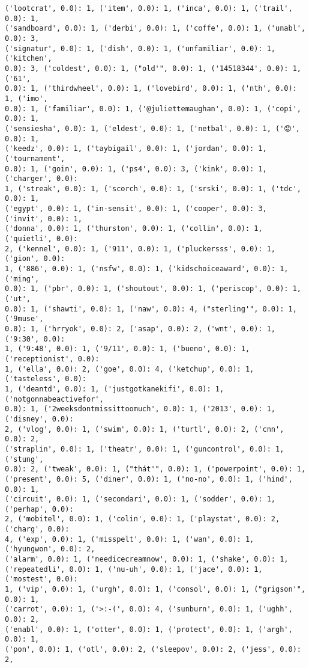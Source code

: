 \documentclass[11pt]{article}
\begin{document}
\begin{Verbatim}[commandchars=\\\{\}]
('lootcrat', 0.0): 1, ('item', 0.0): 1, ('inca', 0.0): 1, ('trail', 0.0): 1,
('sandboard', 0.0): 1, ('derbi', 0.0): 1, ('coffe', 0.0): 1, ('unabl', 0.0): 3,
('signatur', 0.0): 1, ('dish', 0.0): 1, ('unfamiliar', 0.0): 1, ('kitchen',
0.0): 3, ('coldest', 0.0): 1, ("old'", 0.0): 1, ('14518344', 0.0): 1, ('61',
0.0): 1, ('thirdwheel', 0.0): 1, ('lovebird', 0.0): 1, ('nth', 0.0): 1, ('imo',
0.0): 1, ('familiar', 0.0): 1, ('@juliettemaughan', 0.0): 1, ('copi', 0.0): 1,
('sensiesha', 0.0): 1, ('eldest', 0.0): 1, ('netbal', 0.0): 1, ('😟', 0.0): 1,
('keedz', 0.0): 1, ('taybigail', 0.0): 1, ('jordan', 0.0): 1, ('tournament',
0.0): 1, ('goin', 0.0): 1, ('ps4', 0.0): 3, ('kink', 0.0): 1, ('charger', 0.0):
1, ('streak', 0.0): 1, ('scorch', 0.0): 1, ('srski', 0.0): 1, ('tdc', 0.0): 1,
('egypt', 0.0): 1, ('in-sensit', 0.0): 1, ('cooper', 0.0): 3, ('invit', 0.0): 1,
('donna', 0.0): 1, ('thurston', 0.0): 1, ('collin', 0.0): 1, ('quietli', 0.0):
2, ('kennel', 0.0): 1, ('911', 0.0): 1, ('pluckersss', 0.0): 1, ('gion', 0.0):
1, ('886', 0.0): 1, ('nsfw', 0.0): 1, ('kidschoiceaward', 0.0): 1, ('ming',
0.0): 1, ('pbr', 0.0): 1, ('shoutout', 0.0): 1, ('periscop', 0.0): 1, ('ut',
0.0): 1, ('shawti', 0.0): 1, ('naw', 0.0): 4, ("sterling'", 0.0): 1, ('9muse',
0.0): 1, ('hrryok', 0.0): 2, ('asap', 0.0): 2, ('wnt', 0.0): 1, ('9:30', 0.0):
1, ('9:48', 0.0): 1, ('9/11', 0.0): 1, ('bueno', 0.0): 1, ('receptionist', 0.0):
1, ('ella', 0.0): 2, ('goe', 0.0): 4, ('ketchup', 0.0): 1, ('tasteless', 0.0):
1, ('deantd', 0.0): 1, ('justgotkanekifi', 0.0): 1, ('notgonnabeactivefor',
0.0): 1, ('2weeksdontmissittoomuch', 0.0): 1, ('2013', 0.0): 1, ('disney', 0.0):
2, ('vlog', 0.0): 1, ('swim', 0.0): 1, ('turtl', 0.0): 2, ('cnn', 0.0): 2,
('straplin', 0.0): 1, ('theatr', 0.0): 1, ('guncontrol', 0.0): 1, ('stung',
0.0): 2, ('tweak', 0.0): 1, ("thát'", 0.0): 1, ('powerpoint', 0.0): 1,
('present', 0.0): 5, ('diner', 0.0): 1, ('no-no', 0.0): 1, ('hind', 0.0): 1,
('circuit', 0.0): 1, ('secondari', 0.0): 1, ('sodder', 0.0): 1, ('perhap', 0.0):
2, ('mobitel', 0.0): 1, ('colin', 0.0): 1, ('playstat', 0.0): 2, ('charg', 0.0):
4, ('exp', 0.0): 1, ('misspelt', 0.0): 1, ('wan', 0.0): 1, ('hyungwon', 0.0): 2,
('alarm', 0.0): 1, ('needicecreamnow', 0.0): 1, ('shake', 0.0): 1,
('repeatedli', 0.0): 1, ('nu-uh', 0.0): 1, ('jace', 0.0): 1, ('mostest', 0.0):
1, ('vip', 0.0): 1, ('urgh', 0.0): 1, ('consol', 0.0): 1, ("grigson'", 0.0): 1,
('carrot', 0.0): 1, ('>:-(', 0.0): 4, ('sunburn', 0.0): 1, ('ughh', 0.0): 2,
('enabl', 0.0): 1, ('otter', 0.0): 1, ('protect', 0.0): 1, ('argh', 0.0): 1,
('pon', 0.0): 1, ('otl', 0.0): 2, ('sleepov', 0.0): 2, ('jess', 0.0): 2,

\end{Verbatim}
\end{document}
